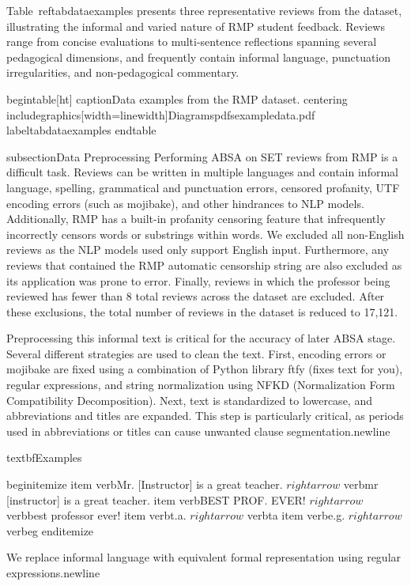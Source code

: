 Table~ref{tabdataexamples} presents three representative reviews from the dataset, 
illustrating the informal and varied nature of RMP student feedback. Reviews range from 
concise evaluations to multi-sentence reflections spanning several 
pedagogical dimensions, and frequently contain informal language, punctuation 
irregularities, and non-pedagogical commentary.

begin{table}[ht]
    caption{Data examples from the RMP dataset.}
    centering
    includegraphics[width=linewidth]{Diagramspdfsexampledata.pdf}
    label{tabdataexamples}
end{table}

subsection{Data Preprocessing}
Performing ABSA on SET reviews from RMP is a difficult task. Reviews can be written in multiple languages and contain informal language, spelling, grammatical and punctuation errors, censored profanity, UTF encoding errors (such as mojibake), and other hindrances to NLP models. Additionally, RMP has a built-in profanity censoring feature that infrequently incorrectly censors words or substrings within words. We excluded all non-English reviews as the NLP models used only support English input. Furthermore, any reviews that contained the RMP automatic censorship string  are also excluded as its application was prone to error. Finally, reviews in which the professor being reviewed has fewer than 8 total reviews across the dataset are excluded. After these exclusions, the total number of reviews in the dataset is reduced to 17,121. 

Preprocessing this informal text is critical for the accuracy of later ABSA stage. Several different strategies are used to clean the text. First, encoding errors or mojibake are fixed using a combination of Python library ftfy (fixes text for you), regular expressions, and string normalization using NFKD (Normalization Form Compatibility Decomposition). Next, text is standardized to lowercase, and abbreviations and titles are expanded. This step is particularly critical, as periods used in abbreviations or titles can cause unwanted clause segmentation.newline

textbf{Examples}

begin{itemize}
    item verbMr. [Instructor] is a great teacher. $rightarrow$ verbmr [instructor] is a great teacher.
    item verbBEST PROF. EVER! $rightarrow$ verbbest professor ever!
    item verbt.a. $rightarrow$ verbta
    item verbe.g. $rightarrow$ verbeg
end{itemize}

We replace informal language with equivalent formal representation using regular expressions.newline

